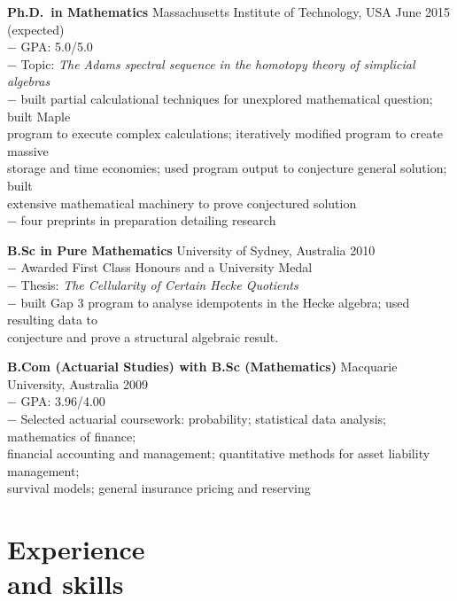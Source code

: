\documentclass[margin,line]{resume}
\newcommand{\CVsection}[1]{\section{\mysidestyle #1}}
\newcommand{\twolineentry}[4]{\textbf{#1} #2 \hfill {#4}\\%
#3
           
\vspace{-3.1mm}}
\newcommand{\FINALtwolineentry}[4]{\textbf{#1} #2 \hfill {#4}\\%
#3}
\begin{document}
\begin{resume}
\twolineentry{Ph.D.\ in Mathematics}{Massachusetts Institute of Technology, USA}{%
\phantom{space}$-$ GPA: 5.0/5.0\\%
\phantom{space}$-$ Topic: \emph{The Adams spectral sequence in the homotopy theory of simplicial algebras}\\%
\phantom{space}$-$ built partial calculational techniques for unexplored mathematical question; built Maple\\
\phantom{space$-$ }program to execute complex calculations; iteratively modified program to create massive\\
\phantom{space$-$ }storage and time economies; used program output to conjecture general solution; built\\
\phantom{space$-$ }extensive mathematical machinery to prove conjectured solution\\
\phantom{space}$-$ four preprints in preparation detailing research
}{June 2015 (expected)}
\twolineentry{B.Sc in Pure Mathematics}{University of Sydney, Australia}{%
\phantom{space}$-$ Awarded First Class Honours and a University Medal\\
\phantom{space}$-$ Thesis: \emph{The Cellularity of Certain Hecke Quotients}\\
\phantom{space}$-$ built Gap 3 program to analyse idempotents in the Hecke algebra; used resulting data to\\
\phantom{space$-$ }conjecture and prove a structural algebraic result.
}{2010}
\FINALtwolineentry{B.Com (Actuarial Studies) with B.Sc (Mathematics)}{Macquarie University, Australia}{
\phantom{space}$-$ GPA: 3.96/4.00\\
\phantom{space}$-$ Selected actuarial coursework: probability; statistical data analysis; mathematics of finance;\\
\phantom{space$-$ }financial accounting and management; quantitative methods for asset liability management;\\
\phantom{space$-$ }survival models; general insurance pricing and reserving
}{2009}
\CVsection{Experience\\and skills}


\end{resume}
\end{document}
